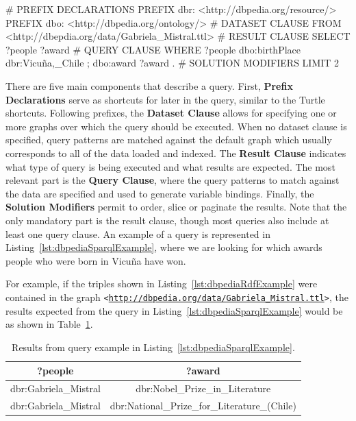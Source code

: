 \begin{sparqlcode}[%
    caption={\SPARQL{} query for getting awards won by people who were born in Vicuña.},
    label={lst:dbpediaSparqlExample}]
# PREFIX DECLARATIONS
PREFIX dbr: <http://dbpedia.org/resource/>
PREFIX dbo: <http://dbpedia.org/ontology/>
# DATASET CLAUSE
FROM <http://dbepdia.org/data/Gabriela_Mistral.ttl>
# RESULT CLAUSE
SELECT ?people ?award
# QUERY CLAUSE
WHERE {
    ?people dbo:birthPlace dbr:Vicuña,_Chile ;
        dbo:award ?award .
}
# SOLUTION MODIFIERS
LIMIT 2
\end{sparqlcode}

There are five main components that describe a \SPARQL{} query. First, \textbf{Prefix Declarations} 
serve as shortcuts for later in the query, similar to the Turtle shortcuts. Following prefixes, 
the \textbf{Dataset Clause} allows for specifying one or more \RDF{} graphs over which the query 
should be executed. When no dataset clause is specified, query patterns are matched against the 
default graph which usually corresponds to all of the data loaded and indexed. The 
\textbf{Result Clause} indicates what type of query is being executed and what results are expected. 
The most relevant part is the \textbf{Query Clause}, where the query patterns to match against the 
data are specified and used to generate variable bindings. Finally, the \textbf{Solution Modifiers} 
permit to order, slice or paginate the results. Note that the only mandatory part is the result 
clause, though most queries also include at least one query clause. An example of a \SPARQL{} query is 
represented in Listing~\ref{lst:dbpediaSparqlExample}, where we are looking for which awards 
people who were born in Vicuña have won.

For example, if the \RDF{} triples shown in Listing~\ref{lst:dbpediaRdfExample} were contained in the 
\RDF{} graph \texttt{<\url{http://dbpedia.org/data/Gabriela\_Mistral.ttl}>}, the results 
expected from the \SPARQL{} query in Listing~\ref{lst:dbpediaSparqlExample} would be as shown 
in Table~\ref{table:dbpediaExampleResults}.

\begin{table}[h!]
    \centering
    \begin{tabular}{ |c|c| }        
        \hline
        ?people & ?award \\ 
        \hline
        dbr:Gabriela\_Mistral & dbr:Nobel\_Prize\_in\_Literature \\
        dbr:Gabriela\_Mistral & dbr:National\_Prize\_for\_Literature\_(Chile) \\
        \hline
    \end{tabular}
    \caption{Results from \SPARQL{} query example in Listing~\ref{lst:dbpediaSparqlExample}.}
    \label{table:dbpediaExampleResults}
\end{table}


